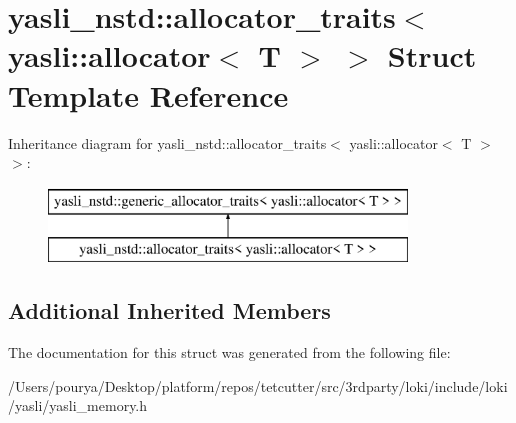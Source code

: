 \hypertarget{structyasli__nstd_1_1allocator__traits_3_01yasli_1_1allocator_3_01T_01_4_01_4}{}\section{yasli\+\_\+nstd\+:\+:allocator\+\_\+traits$<$ yasli\+:\+:allocator$<$ T $>$ $>$ Struct Template Reference}
\label{structyasli__nstd_1_1allocator__traits_3_01yasli_1_1allocator_3_01T_01_4_01_4}
Inheritance diagram for yasli\+\_\+nstd\+:\+:allocator\+\_\+traits$<$ yasli\+:\+:allocator$<$ T $>$ $>$\+:\begin{figure}[H]
\begin{center}
\leavevmode
\includegraphics[height=2.000000cm]{structyasli__nstd_1_1allocator__traits_3_01yasli_1_1allocator_3_01T_01_4_01_4}
\end{center}
\end{figure}
\subsection*{Additional Inherited Members}


The documentation for this struct was generated from the following file\+:\begin{DoxyCompactItemize}
\item 
/\+Users/pourya/\+Desktop/platform/repos/tetcutter/src/3rdparty/loki/include/loki/yasli/yasli\+\_\+memory.\+h\end{DoxyCompactItemize}
